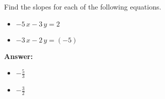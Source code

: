  Find the slopes for each of the following equations. \begin{itemize}\item \( -5 \, x - 3 \, y = 2 \)\item \( -3 \, x - 2 \, y = \left(-5\right) \)\end{itemize}

        \textbf{Answer:} \begin{itemize}\item \( -\frac{5}{3} \)\item \( -\frac{3}{2} \)\end{itemize}
